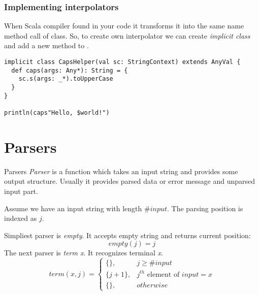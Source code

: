 \documentclass[t]{beamer}
\begin{document}
\begin{frame}[fragile]
\frametitle{Implementing interpolators}

When Scala compiler found  in your code it transforms it into the same name method call
of  class.  So, to create own interpolator we can create \emph{implicit class} and add
a new method to .

\begin{lstlisting}
implicit class CapsHelper(val sc: StringContext) extends AnyVal {
  def caps(args: Any*): String = {
    sc.s(args: _*).toUpperCase
  }
}

println(caps"Hello, $world!")
\end{lstlisting}

\end{frame}

\section{Parsers}

\begin{frame}{Parsers}
\emph{Parser} is a function which takes an input string and provides some output structure.
Usually it provides parsed data or error message and unparsed input part.

Assume we have an input string with length $\#input$. The parsing position is indexed as $j$.

Simpliest parser is \emph{empty}.  It accepts empty string and returns current position:
\begin{equation*}
empty(j) = {j}
\end{equation*}
The next parser is \emph{term x}.  It recognizes terminal \emph{x}.
\begin{equation*}
term(x, j) =
  \begin{cases}
    \{\}, & j \geq \#input \\
    \{j+1\}, & j^{th}\text{ element of }input = x \\
    \{\}, & otherwise
  \end{cases}
\end{equation*}
\end{frame}
\end{document}
